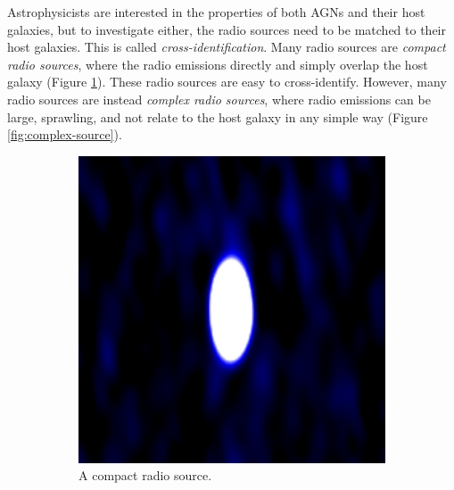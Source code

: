 \documentclass[a4paper]{article}
\newcommand{\fig}{Figure }
\begin{document}
      Astrophysicists are interested in the properties of both AGNs and their host galaxies, but to investigate either, the radio sources need to be matched to their host galaxies. This is called \emph{cross-identification}. Many radio sources are \emph{compact radio sources}, where the radio emissions directly and simply overlap the host galaxy (\fig \ref{fig:compact-source}). These radio sources are easy to cross-identify\cite{banfield15}. However, many radio sources are instead \emph{complex radio sources}, where radio emissions can be large, sprawling, and not relate to the host galaxy in any simple way (\fig \ref{fig:complex-source}).

      \begin{figure}[!ht]
        \centering
          \begin{subfigure}{0.3\textwidth}
            \includegraphics[width=\linewidth]{images/ARG0003r22_radio.png}
            \caption{A compact radio source.}
            \label{fig:compact-source}
          \end{subfigure}
          \quad
          \begin{subfigure}{0.3\textwidth}

\end{subfigure}
\end{figure}
\end{document}
